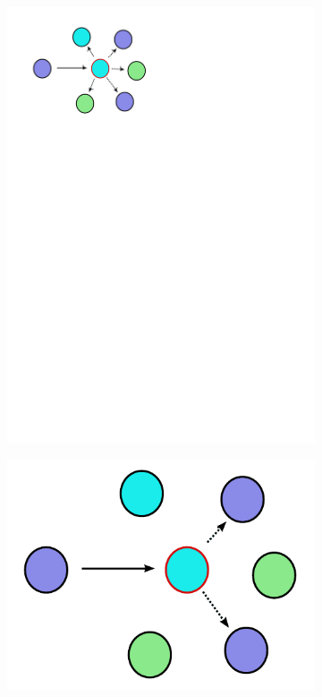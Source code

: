 \documentclass[12pt,a4paper]{article}\usepackage[]{graphicx}\usepackage[]{color}
\begin{document}
\begin{figure}
	\begin{center}
        \begin{subfigure}[b]{0.4\textwidth}
		  \includegraphics[width=\textwidth]{upstream.pdf}
            \caption{}\label{upstream}
        \end{subfigure}
        \qquad
        \begin{subfigure}[b]{0.4\textwidth}
		  \includegraphics[width=\textwidth]{group.pdf}

\end{subfigure}
\end{center}
\end{figure}
\end{document}
